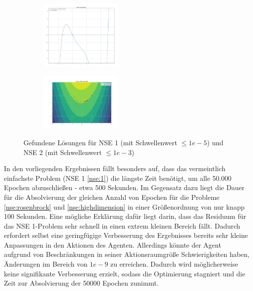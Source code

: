 \documentclass{article}
\theoremstyle{newline}
\begin{document}
\begin{onehalfspace}
\begin{figure}[h]
	\centering
	\begin{subfigure}
		\centering
		\includegraphics[width=0.45\textwidth]{Bilder/solutions_nse1.png}
		\label{fig:solutions_nse1}
	\end{subfigure}
	\hfill
	\begin{subfigure}
		\centering
		\includegraphics[width=0.45\textwidth]{Bilder/solutions_nse2.png}
		\label{fig:solutions_nse2}
	\end{subfigure}
	\caption{Gefundene Lösungen für NSE 1 (mit Schwellenwert $\leq 1e-5$) und NSE 2 (mit Schwellenwert $\leq 1e-3$)}
	\label{fig:solutions_nse1_nse2}
\end{figure}


In den vorliegenden Ergebnissen fällt besonders auf, dass das vermeintlich einfachste Problem (NSE 1 \ref{nse:1}) die längste Zeit benötigt, um alle 50.000 Epochen abzuschließen - etwa 500 Sekunden. Im Gegensatz dazu liegt die Dauer für die Absolvierung der gleichen Anzahl von Epochen für die Probleme \ref{nse:rosenbrock} und \ref{nse:highdimension} in einer Größenordnung von nur knapp 100 Sekunden. Eine mögliche Erklärung dafür liegt darin, dass das Residuum für das NSE 1-Problem sehr schnell in einen extrem kleinen Bereich fällt. Dadurch erfordert selbst eine geringfügige Verbesserung des Ergebnisses bereits sehr kleine Anpassungen in den Aktionen des Agenten. Allerdings könnte der Agent aufgrund von Beschränkungen in seiner Aktionsraumgröße Schwierigkeiten haben, Änderungen im Bereich von $1e-9$ zu erreichen. Dadurch wird möglicherweise keine signifikante Verbesserung erzielt, sodass die Optimierung stagniert und die Zeit zur Absolvierung der 50000 Epochen zunimmt. 


\end{onehalfspace}
\end{document}
